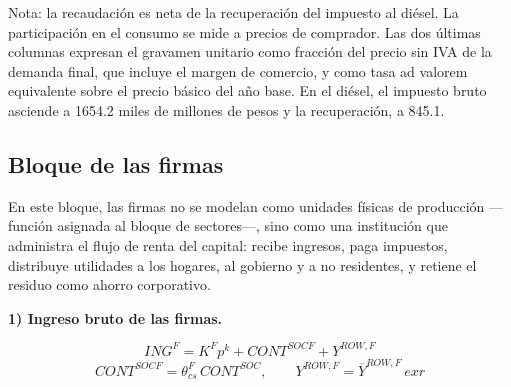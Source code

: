 \documentclass[11pt]{article}
\begin{document}
\begin{table}[H]
\centering
\caption{Calibración de los impuestos específicos, 2023}
\label{tab:tesp-calib}
\small
{}
\par\smallskip
\begin{minipage}{\textwidth}
\footnotesize Nota: la recaudación es neta de la recuperación del impuesto al diésel. La participación en el consumo se mide a precios de comprador. Las dos últimas columnas expresan el gravamen unitario como fracción del precio sin IVA de la demanda final, que incluye el margen de comercio, y como tasa ad valorem equivalente sobre el precio básico del año base. En el diésel, el impuesto bruto asciende a 1654.2 miles de millones de pesos y la recuperación, a 845.1.
\end{minipage}
\end{table}

\subsection{Bloque de las firmas}
\label{sec:firmas}

En este bloque, las firmas no se modelan como unidades físicas de producción ---función asignada al bloque de sectores---, sino como una institución que administra el flujo de renta del capital: recibe ingresos, paga impuestos, distribuye utilidades a los hogares, al gobierno y a no residentes, y retiene el residuo como ahorro corporativo.

\textbf{1) Ingreso bruto de las firmas.}

\[
ING^{F} = K^{F} p^{k} + CONT^{SOCF} + Y^{ROW,F}
\]
\[
CONT^{SOCF}=\theta_{cs}^{F}\, CONT^{SOC}, \qquad Y^{ROW,F}=\overline{Y}^{ROW,F}\,exr
\]
\end{document}
